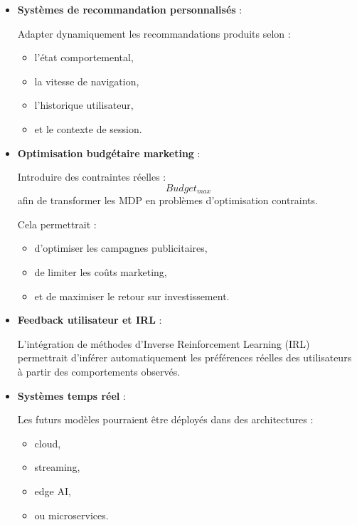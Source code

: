\documentclass[11pt,a4paper]{article}
\begin{document}
\begin{itemize}

\item \textbf{Systèmes de recommandation personnalisés} :

Adapter dynamiquement
les recommandations produits
selon :
\begin{itemize}
    \item l’état comportemental,
    \item la vitesse de navigation,
    \item l’historique utilisateur,
    \item et le contexte de session.
\end{itemize}

\vspace{0.2cm}

\item \textbf{Optimisation budgétaire marketing} :

Introduire des contraintes réelles :
\[
Budget_{max}
\]
afin de transformer les MDP
en problèmes d’optimisation contraints.

Cela permettrait :
\begin{itemize}
    \item d’optimiser les campagnes publicitaires,
    \item de limiter les coûts marketing,
    \item et de maximiser le retour sur investissement.
\end{itemize}

\vspace{0.2cm}

\item \textbf{Feedback utilisateur et IRL} :

L’intégration de méthodes
d’Inverse Reinforcement Learning (IRL)
permettrait d’inférer automatiquement
les préférences réelles des utilisateurs
à partir des comportements observés.

\vspace{0.2cm}

\item \textbf{Systèmes temps réel} :

Les futurs modèles pourraient être déployés
dans des architectures :
\begin{itemize}
    \item cloud,
    \item streaming,
    \item edge AI,
    \item ou microservices.
\end{itemize}


\end{itemize}
\end{document}
